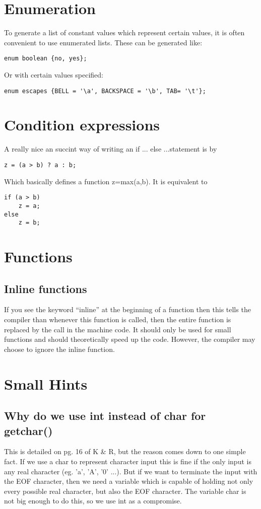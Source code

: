 \section{Enumeration}

To generate a list of constant values which represent certain values, it is often convenient to use enumerated lists. These can be generated like:
\begin{verbatim}
enum boolean {no, yes};
\end{verbatim}
Or with certain values specified:
\begin{verbatim}
enum escapes {BELL = '\a', BACKSPACE = '\b', TAB= '\t'};
\end{verbatim}

\section{Condition expressions}

A really nice an succint way of writing an if ... else ...statement is by
\begin{verbatim}
z = (a > b) ? a : b;
\end{verbatim}
Which basically defines a function z=max(a,b). It is equivalent to 
\begin{verbatim}
if (a > b)
	z = a;
else 
	z = b;
\end{verbatim}

\section{Functions}

\subsection{Inline functions}

If you see the keyword ``inline'' at the beginning of a function then this tells the compiler than whenever this function is called, then the entire function is replaced by the call in the machine code. It should only be used for small functions and should theoretically speed up the code. However, the compiler may choose to ignore the inline function.


\section{Small Hints}

\subsection{Why do we use int instead of char for getchar()}
This is detailed on pg. 16 of K \& R, but the reason comes down to one simple fact. If we use a char to represent character input this is fine if the only input is any real character (eg. 'a', 'A', '0' ...). But if we want to terminate the input with the EOF character, then we need a variable which is capable of holding not only every possible real character, but also the EOF character. The variable char is not big enough to do this, so we use int as a compromise.  

